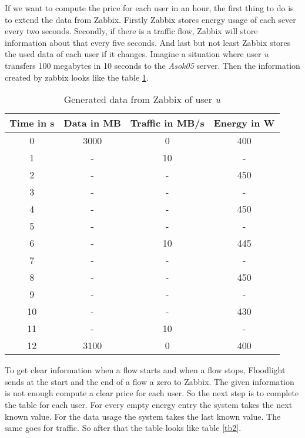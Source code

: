  If we want to compute the price for each user in an hour, the first thing to do is to extend the data from Zabbix. Firstly Zabbix stores energy usage of each sever every two seconds. Secondly, if there is a traffic flow, Zabbix will store information about that every five seconds. And last but not least Zabbix stores the used data of each user if it changes. Imagine a situation where user \textit{u} transfers 100 megabytes in 10 seconds to the \textit{Asok05} server. Then the information created by zabbix looks like the table \ref{tb1}. 
\begin{table}
\centering
\caption{Generated data from Zabbix of user \textit{u}}
\begin{tabular}{|c|c|c|c|}
 \hline Time in s & Data in MB & Traffic in MB/s & Energy in W \\ 
  \hline 0 & 3000 & 0 & 400 \\ 
 \hline 1 & - & 10 & - \\ 
 \hline 2 & - & - & 450 \\ 
 \hline 3 & - & - & -\\ 
 \hline 4 & - & - & 450 \\ 
 \hline 5 & - & - & - \\
 \hline 6 & - & 10 & 445 \\ 
 \hline 7 & - & - & -\\ 
 \hline 8 & - & - & 450 \\ 
 \hline 9 & - & - & - \\  
 \hline 10 & - & - & 430 \\
  \hline 11 & - & 10 & - \\
 \hline 12 & 3100 & 0 & 400 \\  
 \hline 
 \end{tabular}
 \label{tb1} 
 \end{table}
 
 To get clear information when a flow starts and when a flow stops, Floodlight sends at the start and the end of a flow a zero to Zabbix. The given information is not enough compute a clear price for each user. So the next step is to complete the table for each user. For every empty energy entry the system takes the next known value. For the data usage the system takes the last known value. The same goes for traffic. So after that the table looks like table \ref{tb2}.
 
